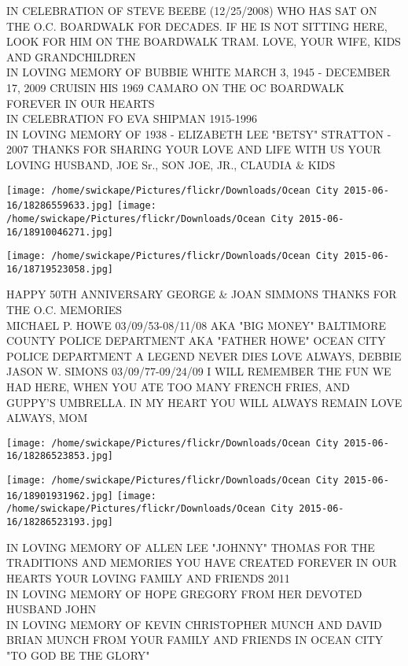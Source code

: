 \documentclass[10pt,letterpaper]{article}
\begin{document}
IN CELEBRATION OF STEVE BEEBE (12/25/2008) WHO HAS SAT ON THE O.C. BOARDWALK FOR DECADES.  IF HE IS NOT SITTING HERE, LOOK FOR HIM ON THE BOARDWALK TRAM.  LOVE, YOUR WIFE, KIDS AND GRANDCHILDREN\\
IN LOVING MEMORY OF BUBBIE WHITE MARCH 3, 1945 {-} DECEMBER 17, 2009 CRUISIN HIS 1969 CAMARO ON THE OC BOARDWALK FOREVER IN OUR HEARTS\\
IN CELEBRATION FO EVA SHIPMAN 1915{-}1996\\
IN LOVING MEMORY OF 1938 {-} ELIZABETH LEE "BETSY" STRATTON {-} 2007 THANKS FOR SHARING YOUR LOVE AND LIFE WITH US YOUR LOVING HUSBAND, JOE Sr., SON JOE, JR., CLAUDIA \& KIDS
\pagebreak

\texttt{[image: /home/swickape/Pictures/flickr/Downloads/Ocean City 2015-06-16/18286559633.jpg]}
\texttt{[image: /home/swickape/Pictures/flickr/Downloads/Ocean City 2015-06-16/18910046271.jpg]}

\texttt{[image: /home/swickape/Pictures/flickr/Downloads/Ocean City 2015-06-16/18719523058.jpg]}

HAPPY 50TH ANNIVERSARY GEORGE \& JOAN SIMMONS THANKS FOR THE O.C. MEMORIES\\
MICHAEL P. HOWE 03/09/53{-}08/11/08 AKA "BIG MONEY" BALTIMORE COUNTY POLICE DEPARTMENT AKA "FATHER HOWE" OCEAN CITY POLICE DEPARTMENT A LEGEND NEVER DIES LOVE ALWAYS, DEBBIE\\
JASON W. SIMONS 03/09/77{-}09/24/09 I WILL REMEMBER THE FUN WE HAD HERE, WHEN YOU ATE TOO MANY FRENCH FRIES, AND GUPPY'S UMBRELLA.  IN MY HEART YOU WILL ALWAYS REMAIN LOVE ALWAYS, MOM
\pagebreak

\texttt{[image: /home/swickape/Pictures/flickr/Downloads/Ocean City 2015-06-16/18286523853.jpg]}

\vspace{0.25in}
\texttt{[image: /home/swickape/Pictures/flickr/Downloads/Ocean City 2015-06-16/18901931962.jpg]}
\texttt{[image: /home/swickape/Pictures/flickr/Downloads/Ocean City 2015-06-16/18286523193.jpg]}

IN LOVING MEMORY OF ALLEN LEE "JOHNNY" THOMAS FOR THE TRADITIONS AND MEMORIES YOU HAVE CREATED FOREVER IN OUR HEARTS YOUR LOVING FAMILY AND FRIENDS 2011\\
IN LOVING MEMORY OF HOPE GREGORY FROM HER DEVOTED HUSBAND JOHN\\
IN LOVING MEMORY OF KEVIN CHRISTOPHER MUNCH AND DAVID BRIAN MUNCH FROM YOUR FAMILY AND FRIENDS IN OCEAN CITY "TO GOD BE THE GLORY"
\pagebreak
\end{document}
